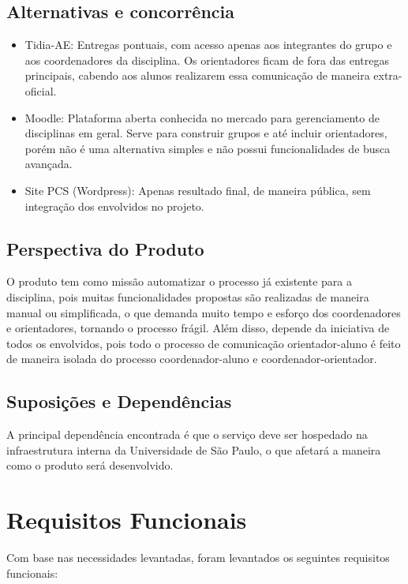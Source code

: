 \subsection{Alternativas e concorrência}
\begin{itemize}
    \item Tidia-AE: Entregas pontuais, com acesso apenas aos integrantes do grupo e aos coordenadores da disciplina. Os orientadores ficam de fora das entregas principais, cabendo aos alunos realizarem essa comunicação de maneira extra-oficial.
    \item Moodle: Plataforma aberta conhecida no mercado para gerenciamento de disciplinas em geral. Serve para construir grupos e até incluir orientadores, porém não é uma alternativa simples e não possui funcionalidades de busca avançada.
    \item Site PCS (Wordpress): Apenas resultado final, de maneira pública, sem integração dos envolvidos no projeto.
\end{itemize}

\subsection{Perspectiva do Produto}
O produto tem como missão automatizar o processo já existente para a disciplina, pois muitas funcionalidades propostas são realizadas de maneira manual ou simplificada, o que demanda muito tempo e esforço dos coordenadores e orientadores, tornando o processo frágil. Além disso, depende da iniciativa de todos os envolvidos, pois todo o processo de comunicação orientador-aluno é feito de maneira isolada do processo coordenador-aluno e coordenador-orientador.

\subsection{Suposições e Dependências}
A principal dependência encontrada é que o serviço deve ser hospedado na infraestrutura interna da Universidade de São Paulo, o que afetará a maneira como o produto será desenvolvido.
  
\section{Requisitos Funcionais}
Com base nas necessidades levantadas, foram levantados os seguintes requisitos funcionais:

